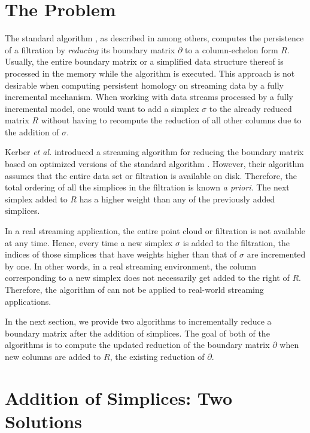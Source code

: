 \documentclass[11pt]{article}
\begin{document}
\section{The Problem}


The standard algorithm \cite{edelsbrunner-00, zomorodian-05}, as described in 
\cite{edelsbrunner-10, otter-17, chen-11, kerber-18} among others, computes the persistence of a 
filtration \cite{zomorodian-10} by \emph{reducing} its boundary matrix $\partial$ to a 
column-echelon form $R$.  Usually, the entire boundary matrix or a simplified data structure 
thereof is processed in the memory while the algorithm is executed.  This approach is not desirable 
when computing persistent homology on streaming data by a fully incremental mechanism.  When 
working with data streams processed by a fully incremental model, one would want to add a simplex 
$\sigma$ to the already reduced matrix $R$ without having to recompute the reduction of all other 
columns due to the addition of $\sigma$.


Kerber \emph{et al.} \cite{kerber-18} introduced a streaming algorithm for reducing the boundary 
matrix based on optimized versions of the standard algorithm \cite{edelsbrunner-00, 
zomorodian-05}.  However, their algorithm assumes that the entire data set or filtration is 
available on disk.  Therefore, the total ordering of all the simplices in the filtration is known 
\emph{a priori}.  The next simplex added to $R$ has a higher weight than any of the previously 
added simplices.


In a real streaming application, the entire point cloud or filtration is not available at any 
time.  Hence, every time a new simplex $\sigma$ is added to the filtration, the indices of those 
simplices that have weights higher than that of $\sigma$ are incremented by one.  In other words, 
in a real streaming environment, the column corresponding to a new simplex does not necessarily get 
added to the right of $R$.  Therefore, the algorithm of \cite{kerber-18} can not be applied to 
real-world streaming applications.


In the next section, we provide two algorithms to incrementally reduce a boundary matrix after the 
addition of simplices.  The goal of both of the algorithms is to compute the updated reduction of 
the boundary matrix $\partial$ when new columns are added to $R$, the existing reduction of 
$\partial$.



\section{Addition of Simplices: Two Solutions}
\end{document}

